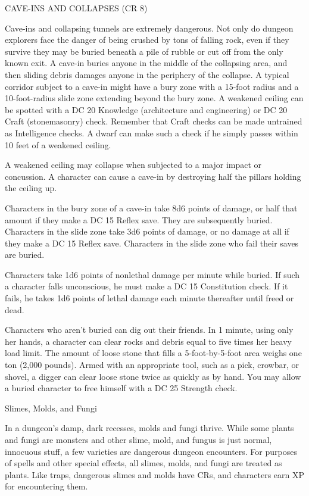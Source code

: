 \documentclass{article}
\begin{document}
\vspace{12pt}
{\large{}CAVE-INS AND COLLAPSES (CR 8)}

Cave-ins and collapsing tunnels are extremely dangerous. Not only do dungeon explorers 
face the danger of being crushed by tons of falling rock, even if they survive 
they may be buried beneath a pile of rubble or cut off from the only known exit. 
A cave-in buries anyone in the middle of the collapsing area, and then sliding 
debris damages anyone in the periphery of the collapse. A typical corridor subject 
to a cave-in might have a bury zone with a 15-foot radius and a 10-foot-radius 
slide zone extending beyond the bury zone. A weakened ceiling can be spotted with 
a DC 20 Knowledge (architecture and engineering) or DC 20 Craft (stonemasonry) 
check. Remember that Craft checks can be made untrained as Intelligence checks. 
A dwarf can make such a check if he simply passes within 10 feet of a weakened 
ceiling. 

A weakened ceiling may collapse when subjected to a major impact or concussion. 
A character can cause a cave-in by destroying half the pillars holding the ceiling 
up. 

Characters in the bury zone of a cave-in take 8d6 points of damage, or half that 
amount if they make a DC 15 Reflex save. They are subsequently buried. Characters 
in the slide zone take 3d6 points of damage, or no damage at all if they make a 
DC 15 Reflex save. Characters in the slide zone who fail their saves are buried.

Characters take 1d6 points of nonlethal damage per minute while buried. If such 
a character falls unconscious, he must make a DC 15 Constitution check. If it fails, 
he takes 1d6 points of lethal damage each minute thereafter until freed or dead.

Characters who aren't buried can dig out their friends. In 1 minute, using only 
her hands, a character can clear rocks and debris equal to five times her heavy 
load limit. The amount of loose stone that fills a 5-foot-by-5-foot area weighs 
one ton (2,000 pounds). Armed with an appropriate tool, such as a pick, crowbar, 
or shovel, a digger can clear loose stone twice as quickly as by hand. You may 
allow a buried character to free himself with a DC 25 Strength check.

\vspace{12pt}
Slimes, Molds, and Fungi

In a dungeon's damp, dark recesses, molds and fungi thrive. While some plants and 
fungi are monsters and other slime, mold, and fungus is just normal, innocuous 
stuff, a few varieties are dangerous dungeon encounters. For purposes of spells 
and other special effects, all slimes, molds, and fungi are treated as plants. 
Like traps, dangerous slimes and molds have CRs, and characters earn XP for encountering 
them.
\end{document}
